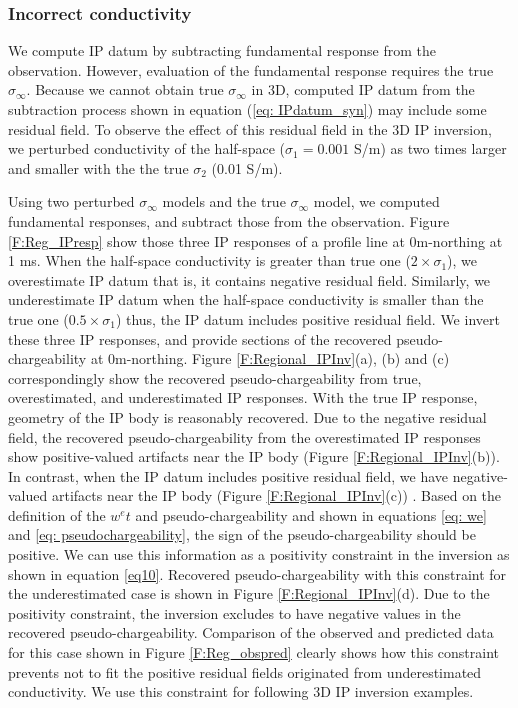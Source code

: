 \documentclass[a4paper, 11pt]{article}
\newcommand{\siginf}{\sigma_\infty}
\begin{document}
\subsubsection{Incorrect conductivity}
We compute IP datum by subtracting fundamental response from the observation. 
However, evaluation of the fundamental response requires the true $\siginf$. 
Because we cannot obtain true $\siginf$ in 3D, computed IP datum from the subtraction process shown in equation (\ref{eq: IPdatum_syn}) may include some residual field. 
To observe the effect of this residual field in the 3D IP inversion, we perturbed conductivity of the half-space ($\sigma_1=0.001$ S/m) as two times larger and smaller with the the true $\sigma_2$ (0.01 S/m).

Using two perturbed $\siginf$ models and the true $\siginf$ model, we computed fundamental responses, and subtract those from the observation. 
Figure \ref{F:Reg_IPresp} show those three IP responses of a profile line at 0m-northing at 1 ms.  
When the half-space conductivity is greater than true one ($2\times\sigma_1$), we overestimate IP datum that is, it contains negative residual field. 
Similarly, we underestimate IP datum when the half-space conductivity is smaller than the true one ($0.5\times\sigma_1$) thus, the IP datum includes positive residual field.
We invert these three IP responses, and provide sections of the recovered pseudo-chargeability at 0m-northing. 
Figure \ref{F:Regional_IPInv}(a), (b) and (c) correspondingly show the recovered pseudo-chargeability from true, overestimated, and underestimated IP responses. 
With the true IP response, geometry of the IP body is reasonably recovered. 
Due to the negative residual field, the recovered pseudo-chargeability from the overestimated IP responses show positive-valued artifacts near the IP body (Figure \ref{F:Regional_IPInv}(b)). 
In contrast, when the IP datum includes positive residual field, we have negative-valued artifacts near the IP body (Figure \ref{F:Regional_IPInv}(c)) . 
Based on the definition of the  $w^e{t}$ and pseudo-chargeability and shown in equations \ref{eq: we} and \ref{eq: pseudochargeability}, the sign of the pseudo-chargeability should be positive. 
We can use this information as a positivity constraint in the inversion as shown in equation \ref{eq10}. 
Recovered pseudo-chargeability with this constraint for the underestimated case is shown in Figure \ref{F:Regional_IPInv}(d). 
Due to the positivity constraint, the inversion excludes to have negative values in the recovered pseudo-chargeability. 
Comparison of the observed and predicted data for this case shown in Figure \ref{F:Reg_obspred} clearly shows how this constraint prevents not to fit the positive residual fields originated from underestimated conductivity. 
We use this constraint for following 3D IP inversion examples. 
\end{document}
